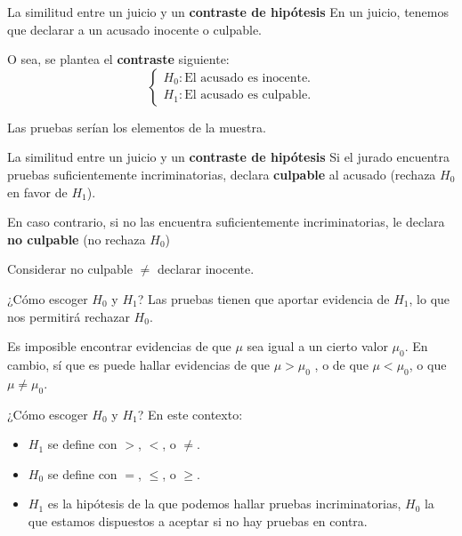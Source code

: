 \documentclass[
  ignorenonframetext,
]{beamer}
\begin{document}
\begin{frame}{La similitud entre un juicio y un \textbf{contraste de
hipótesis}}
\protect\hypertarget{la-similitud-entre-un-juicio-y-un-contraste-de-hipuxf3tesis}{}
En un juicio, tenemos que declarar a un acusado inocente o culpable.

O sea, se plantea el \textbf{contraste} siguiente: \[
\left\{\begin{array}{ll} 
H_{0}:\mbox{El acusado es inocente.}\\ 
H_{1}:\mbox{El acusado es culpable.}
\end{array}
\right.
\]

Las pruebas serían los elementos de la muestra.
\end{frame}

\begin{frame}{La similitud entre un juicio y un \textbf{contraste de
hipótesis}}
\protect\hypertarget{la-similitud-entre-un-juicio-y-un-contraste-de-hipuxf3tesis-1}{}
Si el jurado encuentra pruebas suficientemente incriminatorias, declara
\textbf{culpable} al acusado (rechaza \(H_0\) en favor de \(H_1\)).

En caso contrario, si no las encuentra suficientemente incriminatorias,
le declara \textbf{no culpable} (no rechaza \(H_0\))

Considerar no culpable \(\neq\) declarar inocente.
\end{frame}

\begin{frame}{¿Cómo escoger \(H_0\) y \(H_1\)?}
\protect\hypertarget{cuxf3mo-escoger-h_0-y-h_1}{}
Las pruebas tienen que aportar evidencia de \(H_1\), lo que nos
permitirá rechazar \(H_0\).

Es imposible encontrar evidencias de que \(\mu\) sea igual a un cierto
valor \(\mu_0\). En cambio, sí que es puede hallar evidencias de que
\(\mu > \mu_0\) , o de que \(\mu<\mu_0\), o que \(\mu\neq\mu_0\).
\end{frame}

\begin{frame}{¿Cómo escoger \(H_0\) y \(H_1\)?}
\protect\hypertarget{cuxf3mo-escoger-h_0-y-h_1-1}{}
En este contexto:

\begin{itemize}[<+->]
\item
  \(H_1\) se define con \(>\), \(<\), o \(\neq\).
\item
  \(H_0\) se define con \(=\), \(\leq\), o \(\geq\).
\item
  \(H_1\) es la hipótesis de la que podemos hallar pruebas
  incriminatorias, \(H_0\) la que estamos dispuestos a aceptar si no hay
  pruebas en contra.
\end{itemize}
\end{frame}
\end{document}
